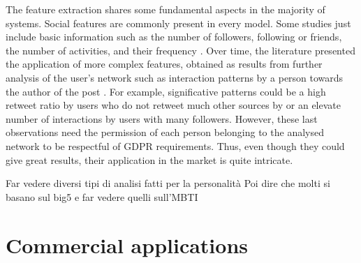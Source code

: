 The feature extraction shares some fundamental aspects in the majority of systems. Social features are commonly present in every model.
Some studies just include basic information such as the number of followers, following or friends, the number of activities, and their frequency \cite{quercia2011our}. Over time, the literature presented the application of more complex features, obtained as results from further analysis of the user's network such as interaction patterns by a person towards the author of the post \cite{dickinson2015identifying}.
For example, significative patterns could be a high retweet ratio by users who do not retweet much other sources by or an elevate number of interactions by users with many followers. However, these last observations need the permission of each person belonging to the analysed network to be respectful of GDPR requirements. Thus, even though they could give great results, their application in the market is quite intricate.

Far vedere diversi tipi di analisi fatti per la personalità
Poi dire che molti si basano sul big5 e far vedere quelli sull'MBTI
\section{Commercial applications}